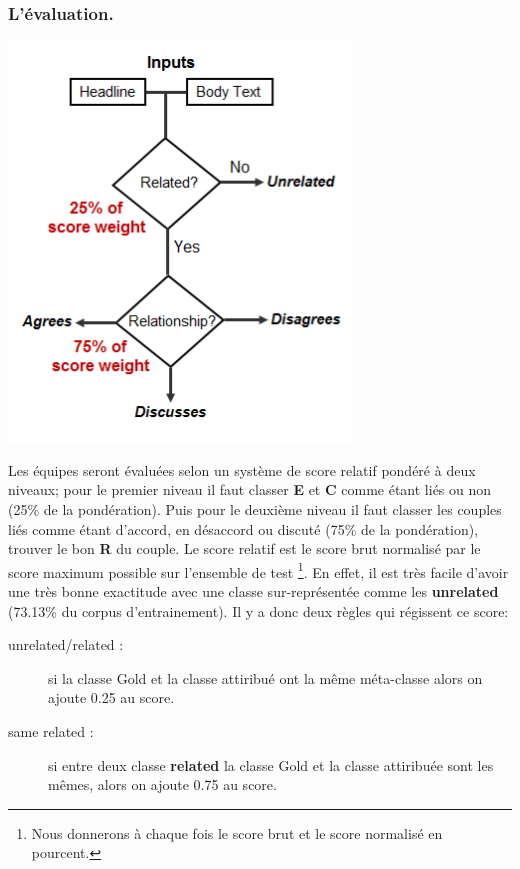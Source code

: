 \documentclass[onecolumn, 12pt]{article}
\begin{document}
\subsubsection{L'évaluation.}
\begin{center}
 \includegraphics[scale=0.5]{../../img/fnc-eval/fnc-eval.png}
 \label{fig_eval}
\end{center}

Les équipes seront évaluées selon un système de score relatif pondéré à deux niveaux; pour le premier niveau il faut classer \textbf{E} et \textbf{C} comme étant liés ou non (25\% de la pondération).
Puis pour le deuxième niveau il faut classer les couples liés comme étant d'accord, en désaccord ou discuté (75\% de la pondération), trouver le bon \textbf{R} du couple.
Le score relatif est le score brut normalisé par le score maximum possible sur l'ensemble de test \footnote{Nous donnerons à chaque fois le score brut et le score normalisé en pourcent.}.
En effet, il est très facile d'avoir une très bonne exactitude avec une classe sur-représentée comme les \textbf{unrelated} (73.13\% du corpus d'entrainement).
Il y a donc deux règles qui régissent ce score:
\begin{description}
 \item [unrelated/related :] si la classe Gold et la classe attiribué ont la même méta-classe alors on ajoute 0.25 au score.
 \item [same related :] si entre deux classe \textbf{related} la classe Gold et la classe attiribuée sont les mêmes, alors on ajoute 0.75 au score.
\end{description}
\end{document}
